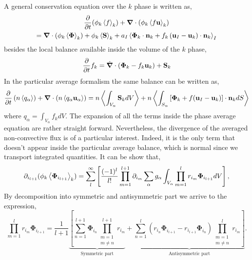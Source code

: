 A general conservation equation over the $k$ phase is written as, 
\begin{multline}
    \frac{\partial}{\partial t} (\phi_k\left<f\right>_k)
    + \bm{\nabla} \cdot \left(
        \phi_k \left<f \textbf{u}\right>_k
    \right)\\
    = \bm{\nabla} \cdot \left(
        \phi_k \left<\bm{\Phi}\right>_k
    \right)
    + \phi_k \left<\textbf{S}\right>_k
    + a_I \left<
        \bm{\Phi}_k \cdot \textbf{n}_k
        + f_k 
        \left(
            \textbf{u}_I
            - \textbf{u}_k
        \right) \cdot \textbf{n}_k
    \right>_I 
\label{ap:eq:avg_k_global}
\end{multline}
besides the local balance available inside the volume of the $k$ phase,
\begin{equation}
    \frac{\partial}{\partial t} f_k
    = \hat{\bm{\nabla}} \cdot \left(
        \bm{\Phi}_k
        - f_k\textbf{u}_k
        \right)
    + \textbf{S}_k
\end{equation}
In the particular average formalism the same balance can be written as, 
\begin{equation}
    \frac{\partial}{\partial t}   \left(n \left<q_\alpha\right>\right)
    + \bm{\nabla} \cdot \left(n \left<q_\alpha \textbf{u}_\alpha\right>\right)
    = n \left<\int_{V_\alpha} \textbf{S}_k dV \right>
    + n \left<\int_{S_\alpha} \left[\bm{\Phi}_k + f (\textbf{u}_I-\textbf{u}_k) \right] \cdot \textbf{n}_k d S\right>
\end{equation}
where $q_\alpha = \int_{V_\alpha} f_k dV$.
The expansion of all the terms inside the phase average equation are rather straight forward.
Nevertheless, the divergence of the averaged non-convective flux is of a particular interest. 
Indeed, it is the only term that doesn't appear inside the particular average balance, which is normal since we transport integrated quantities.
It can be show that, 
\begin{equation}
    \partial_{i_{l+1}}
    (\phi_k \left<\bm{\Phi}_{i_{l+1}}\right>_k)=
    \sum_l^\infty
    \left[
        \frac{(-1)^{l}}{l!}
        \prod^{l+1}_{m=1}
        \partial_{i_m}
        \sum_{\alpha}
        g_{\alpha}
        \int_{V_\alpha}
        \prod^{l}_{m=1}
        r_{i_m} \bm{\Phi}_{i_{l+1}}dV
    \right],
\end{equation}
By decomposition into symmetric and antisymmetric part we arrive to the expression, 
\begin{equation}
    \prod^{l}_{m=1} r_{i_m} \bm{\Phi}_{i_{l+1}}
    = \frac{1}{l+1}
    \underbrace{\left[
    \sum_{n=1}^{l+1} \bm{\Phi}_{i_{n}}\prod^{l+1}_{\substack{m=1 \\ m \neq n}} r_{i_m} \right.}_{\text{Symmetric part}}
    +\underbrace{\left.\sum_{n=1}^{l} (r_{i_n}\bm{\Phi}_{i_{l+1}} - r_{i_{l+1}}\bm{\Phi}_{i_{n}}) \prod^{l}_{\substack{m=1 \\ m \neq n}} r_{i_m} \right]}_{\text{Antisymmetric part}}.
\end{equation}
